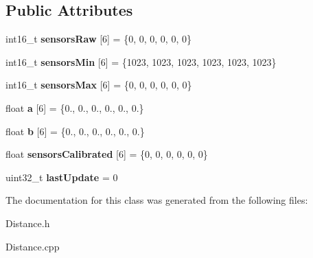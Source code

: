 \subsection*{Public Attributes}
\begin{DoxyCompactItemize}
\item 
\mbox{\label{class_distance_ac7a125bda4d0a1051a65432e6a81df80}} 
int16\+\_\+t {\bfseries sensors\+Raw} \mbox{[}6\mbox{]} = \{0, 0, 0, 0, 0, 0\}
\item 
\mbox{\label{class_distance_a45aa36c346c776c07c4c571afb0b6d07}} 
int16\+\_\+t {\bfseries sensors\+Min} \mbox{[}6\mbox{]} = \{1023, 1023, 1023, 1023, 1023, 1023\}
\item 
\mbox{\label{class_distance_ad297543b8b6594b754fc59c520c535de}} 
int16\+\_\+t {\bfseries sensors\+Max} \mbox{[}6\mbox{]} = \{0, 0, 0, 0, 0, 0\}
\item 
\mbox{\label{class_distance_a596e6343629227348becaae10207ba3b}} 
float {\bfseries a} \mbox{[}6\mbox{]} = \{0., 0., 0., 0., 0., 0.\}
\item 
\mbox{\label{class_distance_aee3b683bd9b0d88242618b17a8900ef5}} 
float {\bfseries b} \mbox{[}6\mbox{]} = \{0., 0., 0., 0., 0., 0.\}
\item 
\mbox{\label{class_distance_aa0f265e5fe43c3fdd01cf5403350fe05}} 
float {\bfseries sensors\+Calibrated} \mbox{[}6\mbox{]} = \{0, 0, 0, 0, 0, 0\}
\item 
\mbox{\label{class_distance_a9952768af57c60288a0733cc07d80e86}} 
uint32\+\_\+t {\bfseries last\+Update} = 0
\end{DoxyCompactItemize}


The documentation for this class was generated from the following files\+:\begin{DoxyCompactItemize}
\item 
Distance.\+h\item 
Distance.\+cpp\end{DoxyCompactItemize}
